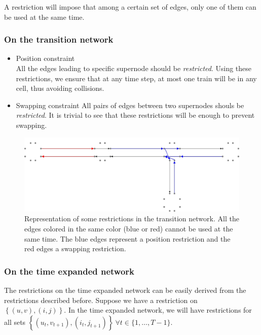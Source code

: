 \documentclass[14pt,a4paper]{article}
\theoremstyle{definition}
\numberwithin{equation}{subsection}
\begin{document}
A restriction will impose that among a certain set of edges, only one of them can be used at the same time.

\subsubsection{On the transition network}



\begin{itemize}
	\item Position constraint\\
	All the edges leading to specific supernode should be \emph{restricted}. Using these restrictions, we ensure that at any time step, at most one train will be in any cell, thus avoiding collisions.
	\item Swapping constraint
	All pairs of edges between two supernodes shouls be \emph{restricted}. It is trivial to see that these restrictions will be enough to prevent swapping.
\end{itemize}


\begin{figure}[h]
	\centering
	\includegraphics[width=0.9\linewidth]{img/rail_split_edge.jpg}
	\caption{Representation of some restrictions in the transition network. All the edges colored in the same color (blue or red) cannot be used at the same time. The blue edges represent a position restriction and the red edges a swapping restriction. }
	\label{fig:restrictions}
\end{figure}

\subsubsection{On the time expanded network}
\label{restrictions}

The restrictions on the time expanded network can be easily derived from the restrictions described before. Suppose we have a restriction on  $\left\{(u,v),(i,j)\right\}$. In the time expanded network, we will have restrictions for all sets $\left\{(u_{t},v_{t+1}),(i_{t},j_{t+1})\right\} \ \forall t \in \{1,\ldots,T-1\}$. 
\end{document}
